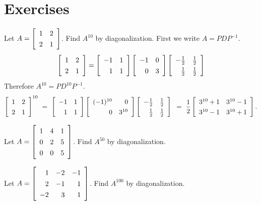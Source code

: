 \documentclass{ximera}
\author{Zack Reed}
\begin{document}
\section*{Exercises}

\begin{example}
  Let $A = \startmat{rr}
    1 & 2 \\
    2 & 1
  \stopmat$. Find $A^{10}$ by diagonalization.
  First we write $A = PDP^{-1}$.
  \begin{equation*}
    \def\arraystretch{1.3}
    \startmat{rr}
      1 & 2 \\
      2 & 1
    \stopmat
    =
    \startmat{rr}
      -1 & 1 \\
      1 & 1
    \stopmat
    \startmat{rr}
      -1 & 0 \\
      0 & 3
    \stopmat
    \startmat{rr}
      -\frac{1}{2} & \frac{1}{2} \\
      \frac{1}{2} & \frac{1}{2}
    \stopmat
  \end{equation*}
  Therefore $A^{10} = PD^{10}P^{-1}$.
  \begin{equation*}
    \def\arraystretch{1.3}
    \startmat{rr}
      1 & 2 \\
      2 & 1
    \stopmat^{10}
    ~=~
    \startmat{rr}
      -1 & 1 \\
      1 & 1
    \stopmat
    \startmat{rr}
      (-1)^{10} & 0 \\
      0 & 3^{10}
    \stopmat
    \startmat{rr}
      -\frac{1}{2} & \frac{1}{2} \\
      \frac{1}{2} & \frac{1}{2}
    \stopmat \\
    ~=~
    \frac{1}{2}\startmat{cc}
      3^{10}+1 & 3^{10}-1 \\
      3^{10}-1 & 3^{10}+1
    \stopmat.
  \end{equation*}
\end{example}

\begin{example}
  Let $A = \startmat{rrr}
    1 & 4 & 1 \\
    0 & 2 & 5 \\
    0 & 0 & 5
  \stopmat$. Find $A^{50}$ by diagonalization.
\end{example}

\begin{example}
  Let $A = \startmat{rrr}
    1 & -2 & -1 \\
    2 & -1 & 1 \\
    -2 & 3 & 1
  \stopmat$. Find $A^{100}$ by diagonalization.
\end{example}
\end{document}
